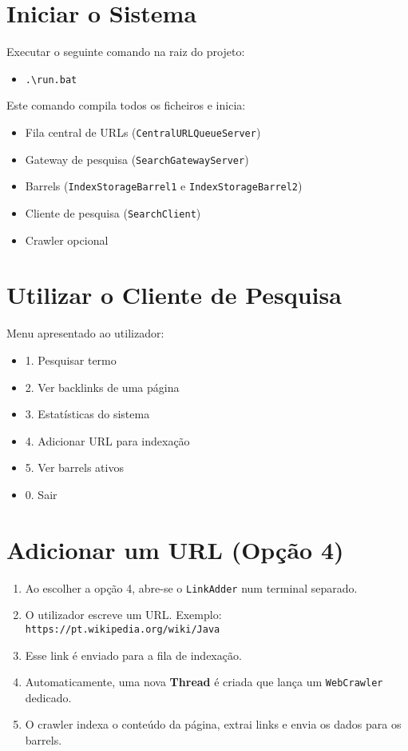 \documentclass{article}
\begin{document}
\section{Iniciar o Sistema}
Executar o seguinte comando na raiz do projeto:

\begin{itemize}
  \item \texttt{.\textbackslash run.bat}
\end{itemize}

Este comando compila todos os ficheiros e inicia:
\begin{itemize}
  \item Fila central de URLs (\texttt{CentralURLQueueServer})
  \item Gateway de pesquisa (\texttt{SearchGatewayServer})
  \item Barrels (\texttt{IndexStorageBarrel1} e \texttt{IndexStorageBarrel2})
  \item Cliente de pesquisa (\texttt{SearchClient})
  \item Crawler opcional
\end{itemize}

\section{Utilizar o Cliente de Pesquisa}

Menu apresentado ao utilizador:

\begin{itemize}
  \item 1. Pesquisar termo
  \item 2. Ver backlinks de uma página
  \item 3. Estatísticas do sistema
  \item 4. Adicionar URL para indexação
  \item 5. Ver barrels ativos
  \item 0. Sair
\end{itemize}

\section{Adicionar um URL (Opção 4)}

\begin{enumerate}
  \item Ao escolher a opção 4, abre-se o \texttt{LinkAdder} num terminal separado.
  \item O utilizador escreve um URL. Exemplo: \texttt{https://pt.wikipedia.org/wiki/Java}
  \item Esse link é enviado para a fila de indexação.
  \item Automaticamente, uma nova \textbf{Thread} é criada que lança um \texttt{WebCrawler} dedicado.
  \item O crawler indexa o conteúdo da página, extrai links e envia os dados para os barrels.
\end{enumerate}
\end{document}
